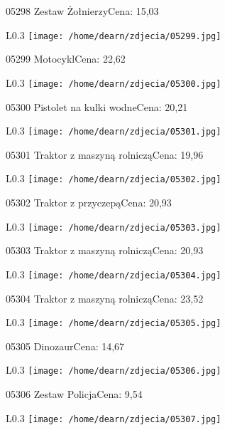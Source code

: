 05298 Zestaw ŻołnierzyCena: 15,03\newline
\begin{wrapfigure}{L}{0.3\textwidth}
\texttt{[image: /home/dearn/zdjecia/05299.jpg]}
\end{wrapfigure}
05299 MotocyklCena: 22,62\newline
\begin{wrapfigure}{L}{0.3\textwidth}
\texttt{[image: /home/dearn/zdjecia/05300.jpg]}
\end{wrapfigure}
05300 Pistolet na kulki wodneCena: 20,21\newline
\begin{wrapfigure}{L}{0.3\textwidth}
\texttt{[image: /home/dearn/zdjecia/05301.jpg]}
\end{wrapfigure}
05301 Traktor z maszyną rolnicząCena: 19,96\newline
\begin{wrapfigure}{L}{0.3\textwidth}
\texttt{[image: /home/dearn/zdjecia/05302.jpg]}
\end{wrapfigure}
05302 Traktor z przyczepąCena: 20,93\newline
\begin{wrapfigure}{L}{0.3\textwidth}
\texttt{[image: /home/dearn/zdjecia/05303.jpg]}
\end{wrapfigure}
05303 Traktor z maszyną rolnicząCena: 20,93\newline
\begin{wrapfigure}{L}{0.3\textwidth}
\texttt{[image: /home/dearn/zdjecia/05304.jpg]}
\end{wrapfigure}
05304 Traktor z maszyną rolnicząCena: 23,52\newline
\begin{wrapfigure}{L}{0.3\textwidth}
\texttt{[image: /home/dearn/zdjecia/05305.jpg]}
\end{wrapfigure}
05305 DinozaurCena: 14,67\newline
\begin{wrapfigure}{L}{0.3\textwidth}
\texttt{[image: /home/dearn/zdjecia/05306.jpg]}
\end{wrapfigure}
05306 Zestaw PolicjaCena: 9,54\newline
\begin{wrapfigure}{L}{0.3\textwidth}
\texttt{[image: /home/dearn/zdjecia/05307.jpg]}
\end{wrapfigure}
